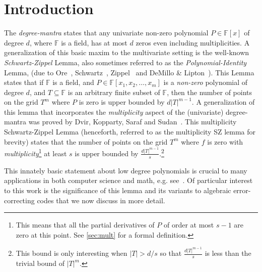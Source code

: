 \documentclass{article}
\def\Field{\mathbb{F}}
\let\F\Field
\begin{document}
	\section{Introduction}
	The \emph{degree-mantra} states that any univariate non-zero
	polynomial $P \in \F[x]$ of degree $d$, where $\F$ is a field, has at
	most $d$ zeros even including multiplicities. A generalization of this
	basic maxim to the multivariate setting is the well-known
	\emph{Schwartz-Zippel} Lemma, also sometimes referred to as the
	\emph{Polynomial-Identity} Lemma, (due to Ore~\cite{Ore1922},
	Schwartz~\cite{Schwartz1980}, Zippel~\cite{Zippel1979} and DeMillo \&
	Lipton~\cite{DemilloL1978}). This Lemma states that if $\F$ is a
	field, and $P \in \F[x_1, x_2, \ldots, x_m]$ is a \emph{non-zero}
	polynomial of degree $d$, and $T\subseteq \F$ is an arbitrary finite
	subset of $\F$, then the number of points on the grid $T^m$ where $P$
	is zero is upper bounded by $d|T|^{m-1}$. A generalization of this lemma that incorporates the
	\emph{multiplicity} aspect of the (univariate) degree-mantra was proved
	by Dvir, Kopparty, Saraf and Sudan~\cite{DvirKSS2013}. This
	multiplicity Schwartz-Zippel Lemma (henceforth, referred to as the
	multiplicity SZ lemma for brevity) states that the number
	of points on the grid $T^m$ where $f$ is zero with
	\emph{multiplicity}\footnote{This means that all the partial
		derivatives of $P$ of order at most $s-1$ are zero at this
		point. See \cref{sec:mult} for a formal definition.} at least
	$s$ is upper bounded by $\frac{d|T|^{m-1}}{s}$.\footnote{This bound is
		only interesting when $|T| > d/s$ so that $\frac{d|T|^{m-1}}{s}$ is
		less than the trivial bound of $|T|^{m}$.}
	
	This innately basic statement about low degree polynomials is crucial to many applications in both computer science and math, e.g. see~\cite{Guth2016}. Of particular interest to this work is the significance of this lemma and its variants to algebraic error-correcting codes that we now discuss in more detail.   
	
\end{document}
